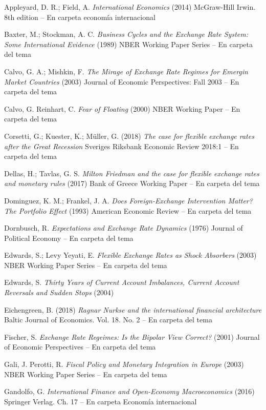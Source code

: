 \documentclass{nuevotema}
\begin{document}
Appleyard, D. R.; Field, A. \textit{International Economics} (2014) McGraw-Hill Irwin. 8th edition -- En carpeta economía internacional

Baxter, M.; Stockman, A. C. \textit{Business Cycles and the Exchange Rate System: Some International Evidence} (1989) NBER Working Paper Series -- En carpeta del tema

Calvo, G. A.; Mishkin, F. \textit{The Mirage of Exchange Rate Regimes for Emergin Market Countries} (2003) Journal of Economic Perspectives: Fall 2003 -- En carpeta del tema

Calvo, G. Reinhart, C. \textit{Fear of Floating} (2000) NBER Working Paper -- En carpeta del tema

Corsetti, G.; Kuester, K.; Müller, G. (2018) \textit{The case for flexible exchange rates after the Great Recession} Sveriges Riksbank Economic Review 2018:1 -- En carpeta del tema

Dellas, H.; Tavlas, G. S. \textit{Milton Friedman and the case for flexible exchange rates and monetary rules} (2017) Bank of Greece Working Paper -- En carpeta del tema

Dominguez, K. M.; Frankel, J. A. \textit{Does Foreign-Exchange Intervention Matter? The Portfolio Effect} (1993) American Economic Review -- En carpeta del tema

Dornbusch, R. \textit{Expectations and Exchange Rate Dynamics} (1976) Journal of Political Economy -- En carpeta del tema

Edwards, S.; Levy Yeyati, E. \textit{Flexible Exchange Rates as Shock Absorbers} (2003) NBER Working Paper Series -- En carpeta del tema

Edwards, S. \textit{Thirty Years of Current Account Imbalances, Current Account Reversals and Sudden Stops} (2004)

Eichengreen, B. (2018) \textit{Ragnar Nurkse and the international financial architecture} Baltic Journal of Economics. Vol. 18. No. 2 -- En carpeta del tema

Fischer, S. \textit{Exchange Rate Regeimes: Is the Bipolar View Correct?} (2001) Journal of Economic Perspectives -- En carpeta del tema

Gali, J. Perotti, R. \textit{Fiscal Policy and Monetary Integration in Europe} (2003) NBER Working Paper Series -- En carpeta del tema

Gandolfo, G. \textit{International Finance and Open-Economy Macroeconomics} (2016) Springer Verlag. Ch. 17 -- En carpeta Economía internacional
\end{document}
